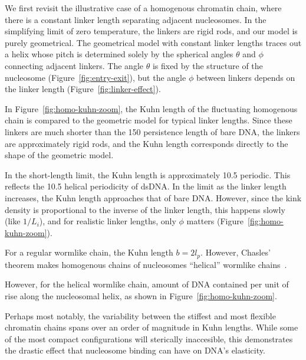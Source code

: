 \documentclass[%
 reprint,
superscriptaddress,
showpacs,preprintnumbers,
 amsmath,amssymb,
 aps,
 prl,
]{revtex4-1}
\newcommand{\RR}{\left\langle{}R^2\right\rangle{}}
\begin{document}
We first revisit the illustrative case of a homogenous chromatin chain, where
    there is a constant linker length separating adjacent nucleosomes.
In the simplifying limit of zero temperature, the linkers are rigid rods, and
    our model is purely geometrical.
The geometrical model with constant linker lengths traces out a helix whose
    pitch is determined solely by the spherical angles $\theta$ and $\phi$
    connecting adjacent linkers.
The angle $\theta$ is fixed by the structure of the nucleosome
    (Figure~\ref{fig:entry-exit}), but the angle $\phi$ between linkers depends
    on the linker length (Figure~\ref{fig:linker-effect}).

In Figure~\ref{fig:homo-kuhn-zoom}, the Kuhn length of the
    fluctuating homogenous chain is compared to the geometric model for
    typical linker lengths.
Since these linkers are much shorter than the \SI{150}{\basepair} persistence
    length of bare DNA, the linkers are approximately rigid rods, and the Kuhn
    length corresponds directly to the shape of the geometric model.

In the short-length limit, the Kuhn length is approximately \SI{10.5}{\basepair}
    periodic.
This reflects the \SI{10.5}{\basepair} helical periodicity of dsDNA.\@
In the limit as the linker length increases, the Kuhn length approaches that of
    bare DNA.\@
However, since the kink density is proportional to the inverse of the linker
    length, this happens slowly (like $1/L_i$), and for realistic linker
    lengths, only $\phi$ matters (Figure~\ref{fig:homo-kuhn-zoom}).

For a regular wormlike chain, the Kuhn length $b = 2 l_p$.
However, Chasles' theorem makes homogenous chains of nucleosomes ``helical''
    wormlike chains~\cite{yamakawa2016}.

However, for the helical wormlike chain, amount of DNA contained per unit of
    rise along the nucleosomal helix, as shown in
    Figure~\ref{fig:homo-kuhn-zoom}.

Perhaps most notably, the variability between the stiffest and most flexible
    chromatin chains spans over an order of magnitude in Kuhn lengths.
While some of the most compact configurations will sterically inaccesible, this
    demonstrates the drastic effect that nucleosome binding can have on DNA's
    elasticity.
\end{document}
